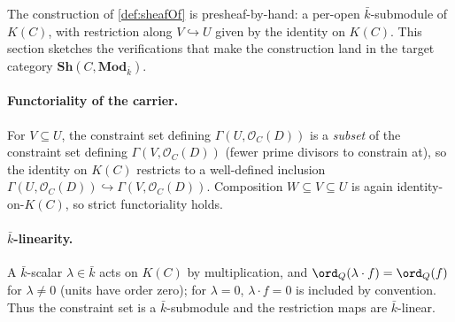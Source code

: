 The construction of \cref{def:sheafOf} is presheaf-by-hand: a
per-open \(\bar k\)-submodule of \(K(C)\), with restriction along
\(V \hookrightarrow U\) given by the identity on \(K(C)\). This section
sketches the verifications that make the construction land in the
target category \(\mathbf{Sh}(C, \mathbf{Mod}_{\bar k})\).

\paragraph{Functoriality of the carrier.} For \(V \subseteq U\), the
constraint set defining \(\Gamma(U, \mathcal O_C(D))\) is a \emph{subset}
of the constraint set defining \(\Gamma(V, \mathcal O_C(D))\) (fewer
prime divisors to constrain at), so the identity on \(K(C)\) restricts
to a well-defined inclusion
\(\Gamma(U, \mathcal O_C(D)) \hookrightarrow \Gamma(V, \mathcal O_C(D))\).
Composition \(W \subseteq V \subseteq U\) is again identity-on-\(K(C)\), so
strict functoriality holds.

\paragraph{\(\bar k\)-linearity.} A \(\bar k\)-scalar \(\lambda \in \bar k\)
acts on \(K(C)\) by multiplication, and
\(\ord_Q(\lambda \cdot f) = \ord_Q(f)\) for \(\lambda \neq 0\)
(units have order zero); for \(\lambda = 0\), \(\lambda \cdot f = 0\) is
included by convention. Thus the constraint set is a
\(\bar k\)-submodule and the restriction maps are \(\bar k\)-linear.

